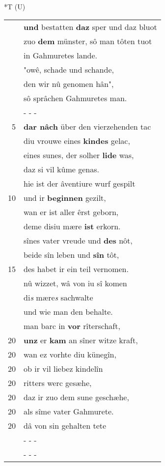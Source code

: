 \documentclass[8pt,a4paper,notitlepage]{article}
\begin{document}
\begin{table}[ht]
\begin{minipage}[t]{0.5\linewidth}
\small
\begin{center}*T (U)
\end{center}
\begin{tabular}{rl}
 & \textbf{und} bestatten \textbf{daz} sper und daz bluot\\ 
 & zuo \textbf{dem} münster, sô man tôten tuot\\ 
 & in Gahmuretes lande.\\ 
 & "owê, schade und schande,\\ 
 & den wir nû genomen hân",\\ 
 & sô sprâchen Gahmuretes man.\\ 
 & \multicolumn{1}{l}{ - - - }\\ 
5 & \textbf{dar nâch} über den vierzehenden tac\\ 
 & diu vrouwe eines \textbf{kindes} gelac,\\ 
 & eines sunes, der solher \textbf{lide} was,\\ 
 & daz si vil kûme genas.\\ 
 & hie ist der âventiure wurf gespilt\\ 
10 & und ir \textbf{beginnen} gezilt,\\ 
 & wan er ist aller êrst geborn,\\ 
 & deme disiu mære \textbf{ist} erkorn.\\ 
 & sînes vater vreude und \textbf{des} nôt,\\ 
 & beide sîn leben und \textbf{sîn} tôt,\\ 
15 & des habet ir ein teil vernomen.\\ 
 & nû wizzet, wâ von iu sî komen\\ 
 & di\textit{s} mære\textit{s} sachwalte\\ 
 & und wie man den behalte.\\ 
 & man barc in \textbf{vor} rîterschaft,\\ 
20 & \textbf{unz} er \textbf{kam} an sîner witze kraft,\\ 
20 & wan ez vorhte diu künegîn,\\ 
20 & ob ir vil liebez kindelîn\\ 
20 & ritters werc gesæhe,\\ 
20 & daz ir zuo dem sune geschæhe,\\ 
20 & als sîme vater Gahmurete.\\ 
20 & dâ von sin gehalten tete\\ 
 & \multicolumn{1}{l}{ - - - }\\ 
 & \multicolumn{1}{l}{ - - - }\\ 

\end{tabular}
\end{minipage}
\end{table}
\end{document}

